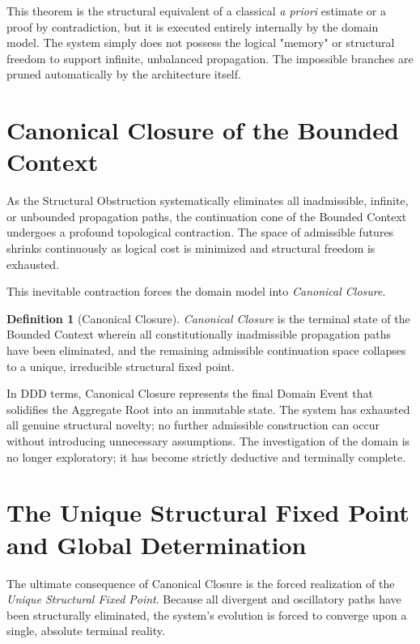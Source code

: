 \documentclass[12pt,openany]{extbook}
\theoremstyle{plain}
\theoremstyle{definition}
\newtheorem{definition}{Definition}[chapter]
\begin{document}
This theorem is the structural equivalent of a classical \emph{a priori} estimate or a proof by contradiction, but it is executed entirely internally by the domain model. The system simply does not possess the logical "memory" or structural freedom to support infinite, unbalanced propagation. The impossible branches are pruned automatically by the architecture itself.

\section{Canonical Closure of the Bounded Context}

As the Structural Obstruction systematically eliminates all inadmissible, infinite, or unbounded propagation paths, the continuation cone of the Bounded Context undergoes a profound topological contraction. The space of admissible futures shrinks continuously as logical cost is minimized and structural freedom is exhausted.

This inevitable contraction forces the domain model into \emph{Canonical Closure}.

\begin{definition}[Canonical Closure]
\emph{Canonical Closure} is the terminal state of the Bounded Context wherein all constitutionally inadmissible propagation paths have been eliminated, and the remaining admissible continuation space collapses to a unique, irreducible structural fixed point.
\end{definition}

In DDD terms, Canonical Closure represents the final Domain Event that solidifies the Aggregate Root into an immutable state. The system has exhausted all genuine structural novelty; no further admissible construction can occur without introducing unnecessary assumptions. The investigation of the domain is no longer exploratory; it has become strictly deductive and terminally complete.

\section{The Unique Structural Fixed Point and Global Determination}

The ultimate consequence of Canonical Closure is the forced realization of the \emph{Unique Structural Fixed Point}. Because all divergent and oscillatory paths have been structurally eliminated, the system's evolution is forced to converge upon a single, absolute terminal reality.
\end{document}
